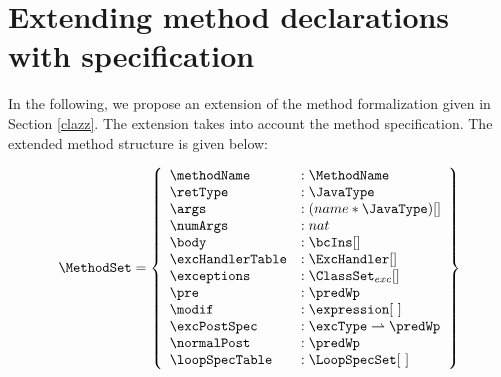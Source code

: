\section{Extending method declarations with specification}\label{methExtend}

In the following, we propose an extension of the method formalization given in Section \ref{clazz}.
 The extension takes into account the method specification. The extended method structure is given below:

$$ \begin{array}{l} %
                     \MethodSet  = \left\{\begin{array}{ll}  
                                                          \methodName & :\MethodName\\
						          \retType & :\JavaType\\
							  \args &  : (name * \JavaType) [] \\
							  \numArgs & : nat \\
							  \body &  : \bcIns [] \\
							  \excHandlerTable & : \ExcHandler [] \\
							  \exceptions &  : \ClassSet_{exc}[] \\
							  \pre & : \predWp \\
							  \modif & :   \expression \lbrack \ \rbrack  \\
							  \excPostSpec & : \excType \rightharpoonup \predWp \\
							  \normalPost & : \predWp \\
                                                          \loopSpecTable & : \LoopSpecSet \lbrack \ \rbrack  
							  
                                     \end{array}  \right\} 
     \end{array} $$

